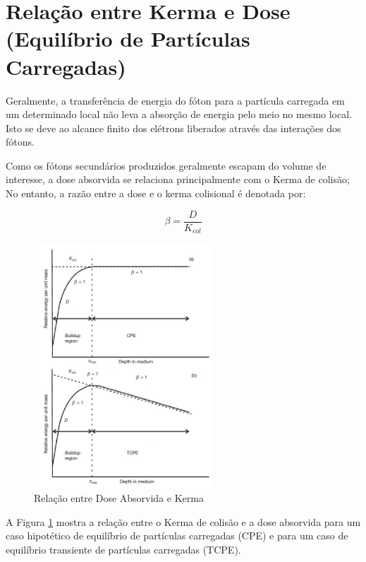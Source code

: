 \documentclass[11pt,a4paper]{article}
\begin{document}
		

	\section{Relação entre Kerma e Dose (Equilíbrio de Partículas Carregadas)}
		

		Geralmente, a transferência de energia do fóton para a partícula carregada em um determinado local não leva a absorção de energia pelo meio no mesmo local. Isto se deve ao alcance finito dos elétrons liberados através das interações dos fótons.

		Como os fótons secundários produzidos geralmente escapam do volume de interesse, a dose absorvida se relaciona principalmente com o Kerma de colisão; No entanto, a razão entre a dose e o kerma colisional é denotada por:

		\begin{equation}
			\beta = \frac{D}{K_{col}}
		\end{equation}

		\begin{figure}[h]
			\centering
			\includegraphics[width=0.60\textwidth]{Imagens/relacaoKermaEDose.jpg}
			\caption{Relação entre Dose Absorvida e Kerma}
			\label{fig:relacaoKermaEDose}
		\end{figure}
		
		A Figura \ref{fig:relacaoKermaEDose} mostra a relação entre o Kerma de colisão e a dose absorvida para um caso hipotético de equilíbrio de partículas carregadas (CPE) e para um caso de equilíbrio transiente de partículas carregadas (TCPE).
\end{document}
